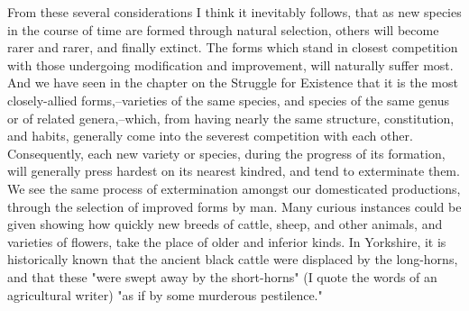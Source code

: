 From these several considerations I think it inevitably follows, that as new species in the course of time are formed through natural selection, others will become rarer and rarer, and finally extinct. The forms which stand in closest competition with those undergoing modification and improvement, will naturally suffer most. And we have seen in the chapter on the Struggle for Existence that it is the most closely-allied forms,--varieties of the same species, and species of the same genus or of related genera,--which, from having nearly the same structure, constitution, and habits, generally come into the severest competition with each other. Consequently, each new variety or species, during the progress of its formation, will generally press hardest on its nearest kindred, and tend to exterminate them. We see the same process of extermination amongst our domesticated productions, through the selection of improved forms by man. Many curious instances could be given showing how quickly new breeds of cattle, sheep, and other animals, and varieties of flowers, take the place of older and inferior kinds. In Yorkshire, it is historically known that the ancient black cattle were displaced by the long-horns, and that these "were swept away by the short-horns" (I quote the words of an agricultural writer) "as if by some murderous pestilence."

